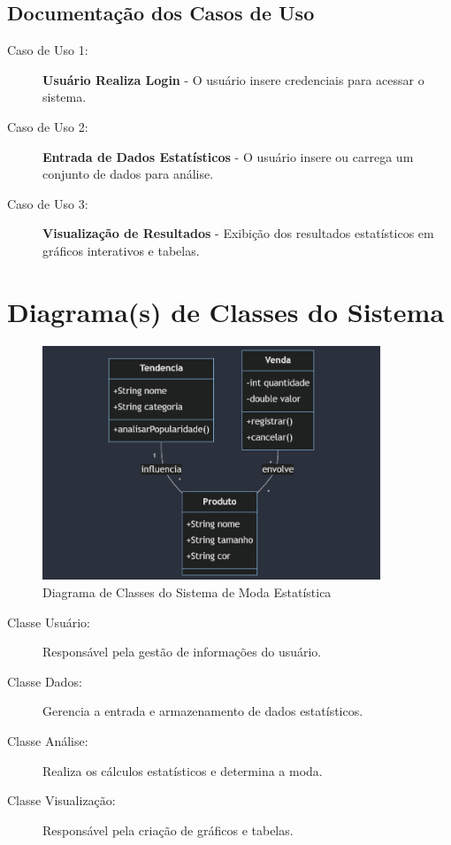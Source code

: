 \documentclass[12pt,a4paper]{article}
\begin{document}
\subsection{Documentação dos Casos de Uso}
\begin{description}
    \item[Caso de Uso 1:] \textbf{Usuário Realiza Login} - O usuário insere credenciais para acessar o sistema.
    \item[Caso de Uso 2:] \textbf{Entrada de Dados Estatísticos} - O usuário insere ou carrega um conjunto de dados para análise.
    \item[Caso de Uso 3:] \textbf{Visualização de Resultados} - Exibição dos resultados estatísticos em gráficos interativos e tabelas.
\end{description}

\newpage
\section{Diagrama(s) de Classes do Sistema}

\begin{figure}[h]
    \centering
    \includegraphics[width=0.9\textwidth]{imagens/classe-diagrama.png}
    \caption{Diagrama de Classes do Sistema de Moda Estatística}
\end{figure}

\begin{description}
    \item[Classe Usuário:] Responsável pela gestão de informações do usuário.
    \item[Classe Dados:] Gerencia a entrada e armazenamento de dados estatísticos.
    \item[Classe Análise:] Realiza os cálculos estatísticos e determina a moda.
    \item[Classe Visualização:] Responsável pela criação de gráficos e tabelas.
\end{description}
\end{document}
